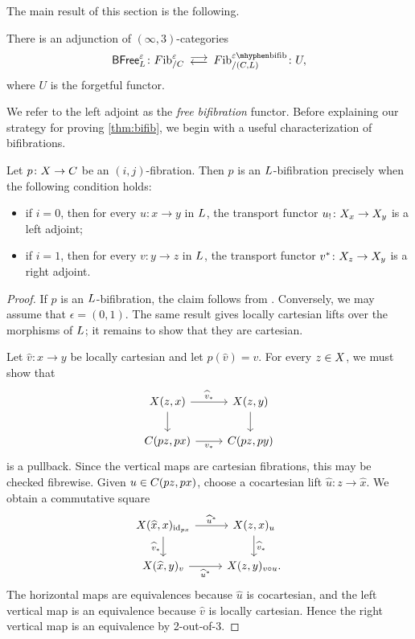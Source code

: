 \documentclass[a4paper,reqno,twoside]{amsart}
\begin{document}
The main result of this section is the following.

\begin{theorem}\label{thm:bifib}
	There is an adjunction of $(\infty,3)$-categories
	\[
		\BFree^{\epsilon}_{\cL}\colon
		\Fib^{\epsilon}_{/\cC}
		\llra
		\Fib_{/(\cC,\cL)}^{\epsilon\mhyphen\bifib}
		\colon U,
	\]
	where $U$ is the forgetful functor.
\end{theorem}

 We refer to the left adjoint as the \emph{free bifibration} functor. Before explaining our strategy for proving \cref{thm:bifib}, we begin with a useful characterization of bifibrations.
 
\begin{proposition}\label{prop:charactbifib}
	Let $p\colon\relax{X}\to\relax{C}$ be an $(i,j)$-fibration. Then $p$ is an $\relax{L}$-bifibration precisely when the following condition holds:
	\begin{itemize}
		\item if $i=0$, then for every $u\colon x\to y$ in $\relax{L}$, the transport functor $u_!\colon\relax{X}_x\to\relax{X}_y$ is a left adjoint;
		\item if $i=1$, then for every $v\colon y\to z$ in $\relax{L}$, the transport functor $v^*\colon\relax{X}_z\to\relax{X}_y$ is a right adjoint.
	\end{itemize}
\end{proposition}
\begin{proof}
	If $p$ is an $\relax{L}$-bifibration, the claim follows from \cite[Corollary 4.1.3]{AbellanGagnaea2025StraighteningLaxTransformations}. Conversely, we may assume that $\epsilon=(0,1)$. The same result gives locally cartesian lifts over the morphisms of $\relax{L}$; it remains to show that they are cartesian.

	Let $\widehat{v}\colon x\to y$ be locally cartesian and let $p(\widehat{v})=v$. For every $z\in\relax{X}$, we must show that
	\[
	\begin{tikzcd}
		\cX(z,x) \arrow[r,"\widehat{v}_*"] \arrow[d] & \cX(z,y) \arrow[d] \\
		\cC(pz,px) \arrow[r,"v_*"'] & \cC(pz,py)
	\end{tikzcd}
	\]
	is a pullback. Since the vertical maps are cartesian fibrations, this may be checked fibrewise. Given $u\in\relax{C}(pz,px)$, choose a cocartesian lift $\widehat{u}\colon z\to\widehat x$. We obtain a commutative square
	\[
	\begin{tikzcd}
		\cX(\widehat x,x)_{\id_{px}} \arrow[r,"\widehat u^*"] \arrow[d,"\widehat v_*"']
		& \cX(z,x)_u \arrow[d,"\widehat{v}_*"] \\
		\cX(\widehat x,y)_{v} \arrow[r,"\widehat u^*"']
		& \cX(z,y)_{v\circ u}.
	\end{tikzcd}
	\]
	The horizontal maps are equivalences because $\widehat u$ is cocartesian, and the left vertical map is an equivalence because $\widehat v$ is locally cartesian. Hence the right vertical map is an equivalence by 2-out-of-3.
\end{proof}
\end{document}
